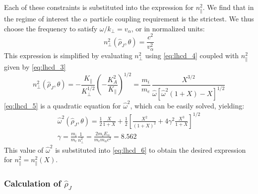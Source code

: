 Each of these constraints is substituted into the expression for $n_\parallel^2$. We find that in the regime of interest the $\alpha$ particle coupling requirement is the strictest. We thus choose the frequency to satisfy $\omega / k _ { \perp } = v _ { \alpha }$, or in normalized units:
\begin{equation}
	n _ { \perp } ^ { 2 } \left( \hat { \rho } _ { J } , \theta \right) = \frac { c ^ { 2 } } { v _ { \alpha } ^ { 2 } }
\end{equation}
This expression is simplified by evaluating $n_\perp^2$ using \cref{eq:lhcd_4} coupled with $n_\parallel^2$ given by \cref{eq:lhcd_3}
\begin{equation}
	n _ { \perp } ^ { 2 } \left( \hat { \rho } _ { J } , \theta \right) = - \frac { K _ { \| } } { K _ { \perp } ^ { 1 / 2 } } \left( - \frac { K _ { A } ^ { 2 } } { K _ { \| } } \right) ^ { 1 / 2 } = \frac { m _ { i } } { m _ { e } } \, \frac { X ^ { 3 / 2 } } { \hat { \omega } \left[ \hat { \omega } ^ { 2 } ( 1 + X ) - X \right] ^ { 1 / 2 } }
	\label{eq:lhcd_5}
\end{equation}
\cref{eq:lhcd_5} is a quadratic equation for $\hat \omega ^2$, which can be easily solved, yielding:
\begin{gather}
	\hat { \omega } ^ { 2 } \left( \hat { \rho } _ { J } , \theta \right) = \frac { 1 } { 2 } \frac { X } { 1 + X } + \frac { 1 } { 2 } \left[ \frac { X ^ { 2 } } { ( 1 + X ) ^ { 2 } } + 4 \gamma ^ { 2 } \frac { X ^ { 3 } } { 1 + X } \right] ^ { 1 / 2 }  \\
	 \gamma = \frac { m _ { i } } { m _ { e } } \frac { 1 } { n _ { \perp } ^ { 2 } } = \frac { 2 m _ { i } E _ { \alpha } } { m _ { e } m _ { \alpha } c ^ { 2 } } = 8.562
\end{gather}
This value of $\hat \omega ^2$ is substituted into \cref{eq:lhcd_6} to obtain the desired expression for $n _ { \| } ^ { 2 } = n _ { \| } ^ { 2 } ( X )$.

\subsubsection{Calculation of $\hat \rho_J$}

